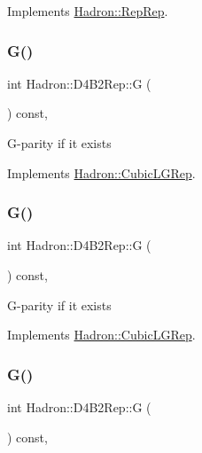 Implements \mbox{\hyperlink{structHadron_1_1RepRep_a92c8802e5ed7afd7da43ccfd5b7cd92b}{Hadron\+::\+Rep\+Rep}}.

\mbox{\label{structHadron_1_1D4B2Rep_a2e5344a605913f47e790ac0c97017024}} 
\subsubsection{\texorpdfstring{G()}{G()}\hspace{0.1cm}{\footnotesize\ttfamily [1/3]}}
{\footnotesize\ttfamily int Hadron\+::\+D4\+B2\+Rep\+::G (\begin{DoxyParamCaption}{ }\end{DoxyParamCaption}) const\hspace{0.3cm}{\ttfamily [inline]}, {\ttfamily [virtual]}}

G-\/parity if it exists 

Implements \mbox{\hyperlink{structHadron_1_1CubicLGRep_ace26f7b2d55e3a668a14cb9026da5231}{Hadron\+::\+Cubic\+L\+G\+Rep}}.

\mbox{\label{structHadron_1_1D4B2Rep_a2e5344a605913f47e790ac0c97017024}} 
\subsubsection{\texorpdfstring{G()}{G()}\hspace{0.1cm}{\footnotesize\ttfamily [2/3]}}
{\footnotesize\ttfamily int Hadron\+::\+D4\+B2\+Rep\+::G (\begin{DoxyParamCaption}{ }\end{DoxyParamCaption}) const\hspace{0.3cm}{\ttfamily [inline]}, {\ttfamily [virtual]}}

G-\/parity if it exists 

Implements \mbox{\hyperlink{structHadron_1_1CubicLGRep_ace26f7b2d55e3a668a14cb9026da5231}{Hadron\+::\+Cubic\+L\+G\+Rep}}.

\mbox{\label{structHadron_1_1D4B2Rep_a2e5344a605913f47e790ac0c97017024}} 
\subsubsection{\texorpdfstring{G()}{G()}\hspace{0.1cm}{\footnotesize\ttfamily [3/3]}}
{\footnotesize\ttfamily int Hadron\+::\+D4\+B2\+Rep\+::G (\begin{DoxyParamCaption}{ }\end{DoxyParamCaption}) const\hspace{0.3cm}{\ttfamily [inline]}, {\ttfamily [virtual]}}

